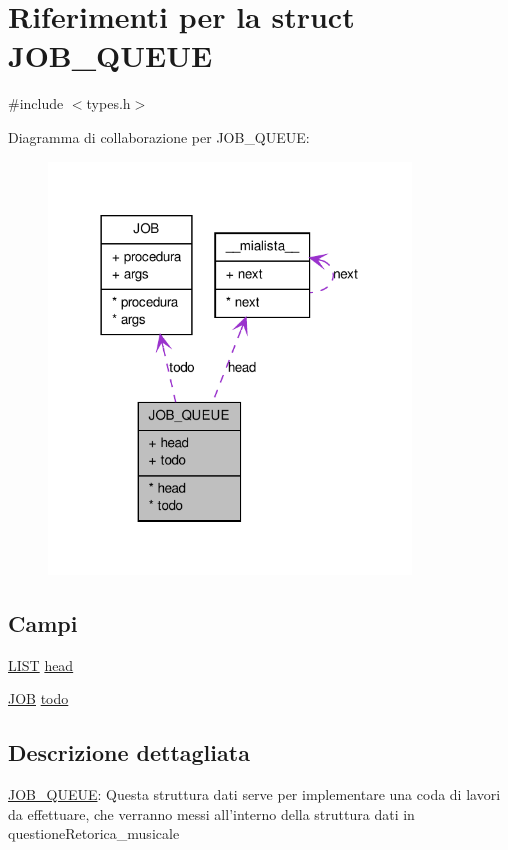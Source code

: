\hypertarget{structJOB__QUEUE}{
\section{Riferimenti per la struct JOB\_\-QUEUE}
\label{structJOB__QUEUE}
}


{\ttfamily \#include $<$types.h$>$}



Diagramma di collaborazione per JOB\_\-QUEUE:
\nopagebreak
\begin{figure}[H]
\begin{center}
\leavevmode
\includegraphics[width=273pt]{structJOB__QUEUE__coll__graph}
\end{center}
\end{figure}
\subsection*{Campi}
{\bf }\par
\begin{DoxyCompactItemize}
\item 
\hyperlink{struct____mialista____}{LIST} \hyperlink{structJOB__QUEUE_a062357df307cecd98a9e1e7b05400d09}{head}
\item 
\hyperlink{structJOB}{JOB} \hyperlink{structJOB__QUEUE_a8b47ceebda88577d79dab26e02d65bde}{todo}
\end{DoxyCompactItemize}



\subsection{Descrizione dettagliata}
\hyperlink{structJOB__QUEUE}{JOB\_\-QUEUE}: Questa struttura dati serve per implementare una coda di lavori da effettuare, che verranno messi all'interno della struttura dati in questioneRetorica\_\-musicale 

